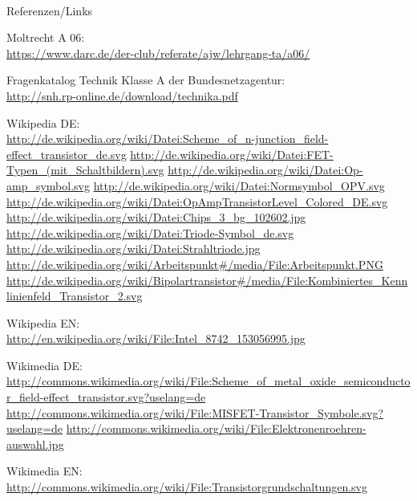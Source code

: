 \renewcommand{\refname}{Referenzen}

\hypertarget{refs}{}
\textcolor{white}{} \\ %
\Large Referenzen/Links
\footnotesize

\begin{thebibliography}{}
       Moltrecht A 06: \\
                    \url{https://www.darc.de/der-club/referate/ajw/lehrgang-ta/a06/}
                    
		Fragenkatalog Technik Klasse A der Bundesnetzagentur:\\
		\url{http://snh.rp-online.de/download/technika.pdf}                    
                    
        Wikipedia DE: \\
    	\url{http://de.wikipedia.org/wiki/Datei:Scheme_of_n-junction_field-effect_transistor_de.svg}
    	\url{http://de.wikipedia.org/wiki/Datei:FET-Typen_(mit_Schaltbildern).svg}
        \url{http://de.wikipedia.org/wiki/Datei:Op-amp_symbol.svg}
        \url{http://de.wikipedia.org/wiki/Datei:Normsymbol_OPV.svg}      
        \url{http://de.wikipedia.org/wiki/Datei:OpAmpTransistorLevel_Colored_DE.svg}  
        \url{http://de.wikipedia.org/wiki/Datei:Chips_3_bg_102602.jpg}
        \url{http://de.wikipedia.org/wiki/Datei:Triode-Symbol_de.svg}
        \url{http://de.wikipedia.org/wiki/Datei:Strahltriode.jpg}
	\url{http://de.wikipedia.org/wiki/Arbeitspunkt#/media/File:Arbeitspunkt.PNG}
	\url{http://de.wikipedia.org/wiki/Bipolartransistor#/media/File:Kombiniertes_Kennlinienfeld_Transistor_2.svg}
                    
    	Wikipedia EN:\\
    	\url{http://en.wikipedia.org/wiki/File:Intel_8742_153056995.jpg}
    	
    	Wikimedia DE:\\
    	\url{http://commons.wikimedia.org/wiki/File:Scheme_of_metal_oxide_semiconductor_field-effect_transistor.svg?uselang=de}
    	\url{http://commons.wikimedia.org/wiki/File:MISFET-Transistor_Symbole.svg?uselang=de}
    	\url{http://commons.wikimedia.org/wiki/File:Elektronenroehren-auswahl.jpg}
    	
     Wikimedia EN:\\
    	\url{http://commons.wikimedia.org/wiki/File:Transistorgrundschaltungen.svg}\
    				
\end{thebibliography} 


